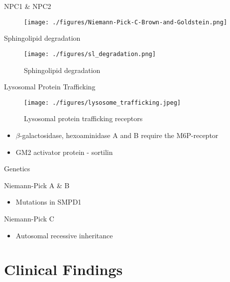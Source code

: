 \documentclass[presentation, smaller]{beamer}
\begin{document}
\begin{frame}[label={sec:orgheadline6}]{NPC1 \& NPC2}
\begin{figure}[htb]
\centering
\texttt{[image: ./figures/Niemann-Pick-C-Brown-and-Goldstein.png]}
\label{fig:}
\end{figure}
\end{frame}


\begin{frame}[label={sec:orgheadline7}]{Sphingolipid degradation}
\begin{figure}[htb]
\centering
\texttt{[image: ./figures/sl\_degradation.png]}
\caption[deg]{\label{fig:sld}
Sphingolipid degradation}
\end{figure}
\end{frame}


\begin{frame}[label={sec:orgheadline8}]{Lysosomal Protein Trafficking}
\begin{figure}[htb]
\centering
\texttt{[image: ./figures/lysosome\_trafficking.jpeg]}
\caption[traf]{\label{fig:traf}
Lysosomal protein trafficking receptors}
\end{figure}

\footnotesize
\begin{itemize}
\item \(\beta\)-galactosidase, hexoaminidase A and B require the M6P-receptor
\item GM2 activator protein - sortilin
\end{itemize}
\end{frame}

\begin{frame}[label={sec:orgheadline9}]{Genetics}
\begin{block}{Niemann-Pick A \& B}
\begin{itemize}
\item Mutations in SMPD1
\end{itemize}
\end{block}
\begin{block}{Niemann-Pick C}
\begin{itemize}
\item Autosomal recessive inheritance
\end{itemize}
\end{block}
\end{frame}

\section{Clinical Findings}
\label{sec:orgheadline14}
\end{document}

